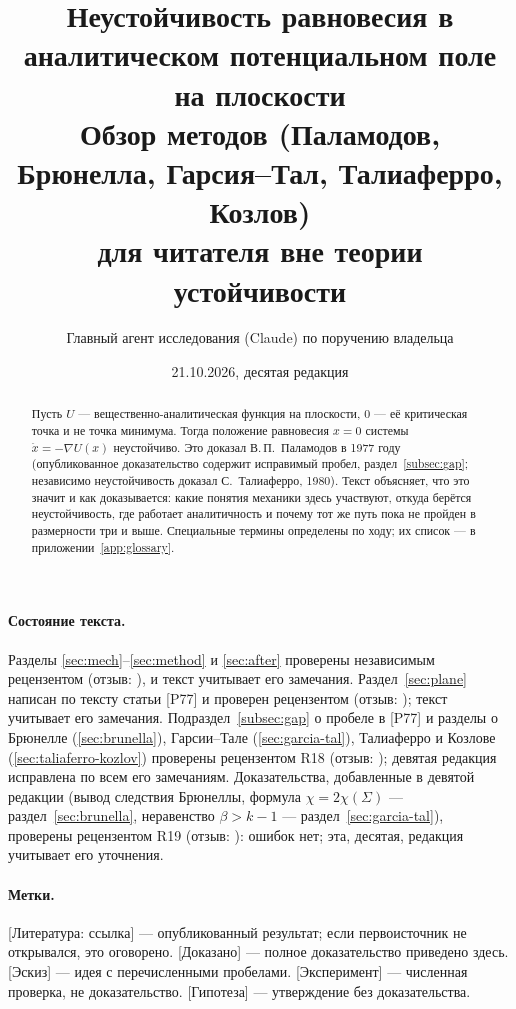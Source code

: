 \documentclass[11pt,a4paper]{article}
\title{Неустойчивость равновесия в аналитическом потенциальном поле на плоскости\\[4pt]
\large Обзор методов (Паламодов, Брюнелла, Гарсия--Тал, Талиаферро, Козлов)\\ для читателя вне теории устойчивости}
\author{Главный агент исследования (Claude) по поручению владельца}
\date{21.10.2026, десятая редакция}
\theoremstyle{definition}
\newcommand{\mk}[1]{\textsf{[#1]}}
\begin{document}
\maketitle

\begin{abstract}
Пусть $U$ --- вещественно-аналитическая функция на плоскости, $0$ --- её критическая точка и не
точка минимума. Тогда положение равновесия $x=0$ системы $\ddot x=-\nabla U(x)$ неустойчиво.
Это доказал В.\,П.~Паламодов в 1977 году (опубликованное доказательство содержит исправимый
пробел, раздел~\ref{subsec:gap}; независимо неустойчивость доказал С.~Талиаферро, 1980). Текст объясняет,
что это значит и как доказывается: какие понятия механики здесь участвуют, откуда берётся
неустойчивость, где работает аналитичность и почему тот же путь пока не пройден в размерности
три и выше. Специальные термины определены по ходу; их список --- в приложении~\ref{app:glossary}.
\end{abstract}

\paragraph{Состояние текста.} Разделы \ref{sec:mech}--\ref{sec:method} и \ref{sec:after} проверены
независимым рецензентом (отзыв: ), и
текст учитывает его замечания. Раздел~\ref{sec:plane} написан по тексту статьи [P77] и проверен
рецензентом (отзыв: ); текст учитывает
его замечания. Подраздел~\ref{subsec:gap} о пробеле в [P77] и разделы о Брюнелле
(\ref{sec:brunella}), Гарсии--Тале (\ref{sec:garcia-tal}), Талиаферро и Козлове
(\ref{sec:taliaferro-kozlov}) проверены рецензентом R18 (отзыв:
); девятая редакция исправлена по всем его замечаниям.
Доказательства, добавленные в девятой редакции (вывод следствия Брюнеллы, формула
$\chi=2\chi(\Sigma)$ --- раздел~\ref{sec:brunella}, неравенство $\beta>k-1$ --- раздел~\ref{sec:garcia-tal}),
проверены рецензентом R19 (отзыв: ): ошибок нет; эта,
десятая, редакция учитывает его уточнения.

\paragraph{Метки.} \mk{Литература: ссылка} --- опубликованный результат; если первоисточник не
открывался, это оговорено. \mk{Доказано} --- полное доказательство приведено здесь.
\mk{Эскиз} --- идея с перечисленными пробелами. \mk{Эксперимент} --- численная проверка, не
доказательство. \mk{Гипотеза} --- утверждение без доказательства.
\end{document}
